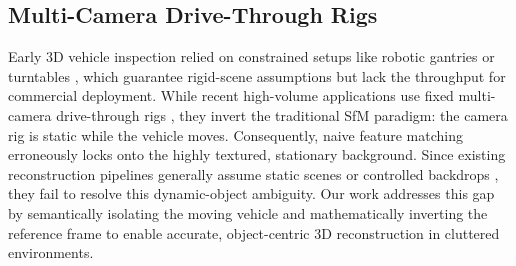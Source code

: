 \documentclass[letterpaper, 10 pt, conference]{ieeeconf}  %
\begin{document}





\subsection{Multi-Camera Drive-Through Rigs}
\label{subsec:related_work_multi_camera_capture_rigs_for_inspection_and_drive_through_systems}

Early 3D vehicle inspection relied on constrained setups like robotic gantries or turntables \cite{jensen2014large}, which guarantee rigid-scene assumptions but lack the throughput for commercial deployment. While recent high-volume applications use fixed multi-camera drive-through rigs \cite{kulkarni2026rig}, they invert the traditional SfM paradigm: the camera rig is static while the vehicle moves. Consequently, naive feature matching erroneously locks onto the highly textured, stationary background. Since existing reconstruction pipelines generally assume static scenes or controlled backdrops \cite{schonberger2016structure}, they fail to resolve this dynamic-object ambiguity. Our work addresses this gap by semantically isolating the moving vehicle and mathematically inverting the reference frame to enable accurate, object-centric 3D reconstruction in cluttered environments.





\end{document}
